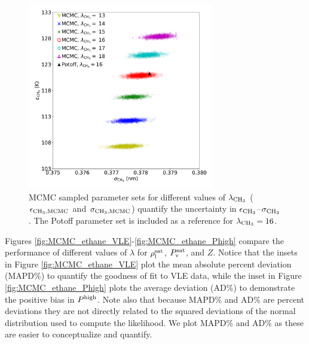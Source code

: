 \documentclass[preprint,letterpaper,floatfix,citeautoscript,aip,jcp]{revtex4-1}
\begin{document}
\begin{figure}[htb!]
	\centering
	\includegraphics[width=3.2in]{MCMC_ethane_parameter_space}
	\caption{MCMC sampled parameter sets for different values of $\lambda_{\rm CH_3}$ ($\epsilon_{\rm CH_3, MCMC}$ and $\sigma_{\rm CH_3, MCMC}$) quantify the uncertainty in $\epsilon_{\rm CH_3}$--$\sigma_{\rm CH_3}$. The Potoff parameter set is included as a reference for $\lambda_{\rm CH_3} = 16$.} 
	\label{fig:MCMC_ethane_parameter_space}
\end{figure}
Figures \ref{fig:MCMC_ethane_VLE}-\ref{fig:MCMC_ethane_Phigh} compare the performance of different values of $\lambda$ for $\rho_{\rm l}^{\rm sat}$, $P_{\rm v}^{\rm sat}$, and $Z$. Notice that the insets in Figure \ref{fig:MCMC_ethane_VLE} plot the mean absolute percent deviation (MAPD\%) to quantify the goodness of fit to VLE data, while the inset in Figure \ref{fig:MCMC_ethane_Phigh} plots the average deviation (AD\%) to demonstrate the positive bias in $P^{\rm high}$. Note also that because MAPD\% and AD\% are percent deviations they are not directly related to the squared deviations of the normal distribution used to compute the likelihood. We plot MAPD\% and AD\% as these are easier to conceptualize and quantify. 
\end{document}
